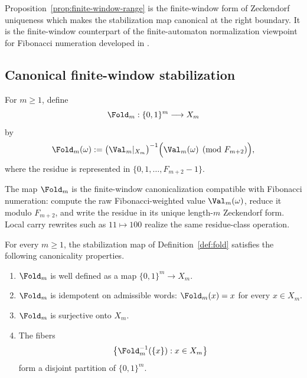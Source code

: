 \begin{remark}
Proposition~\ref{prop:finite-window-range} is the finite-window form of Zeckendorf uniqueness which makes the stabilization map canonical at the right boundary. It is the finite-window counterpart of the finite-automaton normalization viewpoint for Fibonacci numeration developed in \cite{Frougny1992,Berstel2001}.
\end{remark}

\subsection{Canonical finite-window stabilization}\label{sec:stab:fold}

\begin{definition}\label{def:fold}
For $m\ge1$, define
\[
\Fold_m:\{0,1\}^m\longrightarrow X_m
\]
by
\[
\Fold_m(\omega)
:=
\bigl(\Val_m|_{X_m}\bigr)^{-1}
\Bigl(\Val_m(\omega)\pmod {F_{m+2}}\Bigr),
\]
where the residue is represented in $\{0,1,\ldots,F_{m+2}-1\}$.
\end{definition}

\begin{remark}
The map $\Fold_m$ is the finite-window canonicalization compatible with Fibonacci numeration: compute the raw Fibonacci-weighted value $\Val_m(\omega)$, reduce it modulo $F_{m+2}$, and write the residue in its unique length-$m$ Zeckendorf form. Local carry rewrites such as $11\mapsto 100$ realize the same residue-class operation.
\end{remark}

\begin{proposition}\label{thm:fold-suite}
For every $m\ge1$, the stabilization map of Definition~\ref{def:fold}
satisfies the following canonicality properties.
\begin{enumerate}[label=(\roman*)]
  \item $\Fold_m$ is well defined as a map
  $\{0,1\}^m\to X_m$.
  \item $\Fold_m$ is idempotent on admissible words:
  $\Fold_m(x)=x$ for every $x\in X_m$.
  \item $\Fold_m$ is surjective onto $X_m$.
  \item The fibers
  \[
  \bigl\{\Fold_m^{-1}(\{x\}):x\in X_m\bigr\}
  \]
  form a disjoint partition of $\{0,1\}^m$.
\end{enumerate}
\end{proposition}

